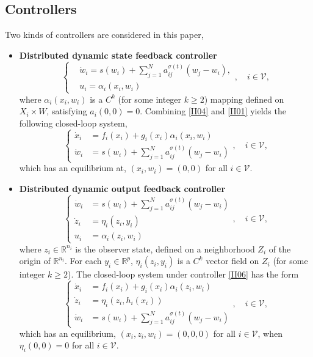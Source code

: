 \documentclass[onecolumn,a4paper,12pt]{article}
\newcommand{\real}{\mathbb{R}}
\numberwithin{equation}{section}
\begin{document}
\subsection{Controllers}
Two kinds of controllers are considered in this paper,
\begin{itemize}
  \item [1)] \textbf{Distributed dynamic state feedback controller}
\begin{equation} \label{II04}
  \left\{
  \begin{split}
    & \dot{w}_i = s(w_i)+\sum_{j=1}^N a_{ij}^{\sigma(t)}(w_j-w_i),\\
    & u_i = \alpha_i(x_i,w_i)
  \end{split}
  \right.,  \quad i\in\mathcal{V},
\end{equation}
where $\alpha_i(x_i,w_i)$ is a $C^k$ (for some integer $k\ge2$) mapping defined on $X_i\times W$, satisfying $a_i(0,0)=0$. Combining \eqref{II04} and \eqref{II01} yields the following closed-loop system,
\begin{equation}
  \label{II05}
  \left\{\begin{split}
    \dot{x}_i& = f_i(x_i)+g_i(x_i)\alpha_i(x_i,w_i)  \\
    \dot{w}_i& = s(w_i)+\sum_{j=1}^N a_{ij}^{\sigma(t)}(w_j-w_i)
  \end{split}, \right.\quad i\in\mathcal{V},
\end{equation}
which has an equilibrium at, $(x_i,w_i)=(0,0)$ for all $i\in\mathcal{V}$.
\item [2)] \textbf{Distributed dynamic output feedback controller}
\begin{equation}
\label{II06}
\left\{ \begin{split}
\dot{w}_i& = s(w_i)+\sum_{j=1}^N a_{ij}^{\sigma(t)}(w_j-w_i)\\
  \dot{z}_i& = \eta_i(z_i,y_i)\\
  u_i &= \alpha_i(z_i,w_i)
\end{split},
\right. \quad i\in\mathcal{V},
\end{equation}
where $z_i\in\real^{n_i}$ is the observer state, defined on a neighborhood $Z_i$ of the origin of $\real^{n_i}$.  For each $y_i\in\real^p$, $\eta_i(z_i,y_i)$ is a $C^k$ vector field on $Z_i$ (for some integer $k\ge 2$). The closed-loop system under controller \eqref{II06} has the form
\begin{equation} \label{II07}
  \left\{
  \begin{split}
    \dot{x}_i&=f_i(x_i)+g_i(x_i)\alpha_i(z_i,w_i)\\
    \dot{z}_i &  = \eta_i(z_i,h_i(x_i))\\
    \dot{w}_i & = s(w_i) + \sum_{j=1}^N a_{ij}^{\sigma(t)}(w_j-w_i)
  \end{split},
  \right.\quad i\in\mathcal{V},
\end{equation}
which has an equilibrium, $(x_i,z_i,w_i)=(0,0,0)$ for all $i\in\mathcal{V}$, when $\eta_i(0,0)=0$ for all $i\in\mathcal{V}$.
\end{itemize}
\end{document}
